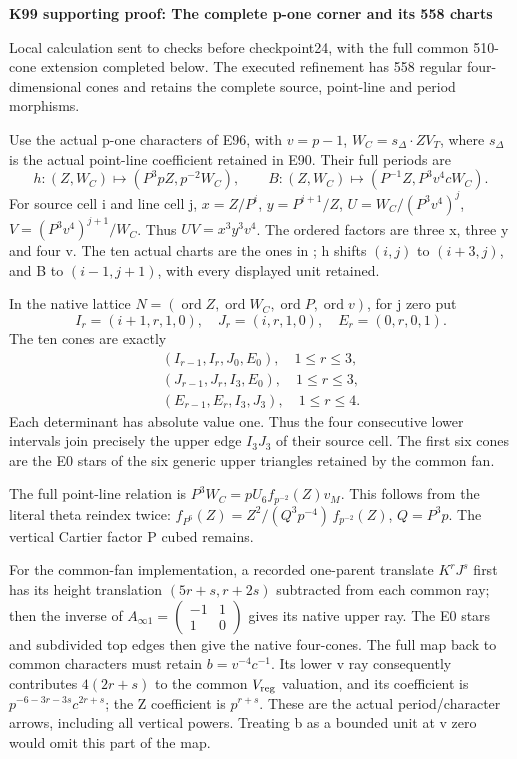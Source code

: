 \par\bigskip\noindent\textbf{K99 supporting proof: The complete p-one corner and its 558 charts}\par\nobreak
Local calculation sent to checks before checkpoint24, with the full
common 510-cone extension completed below. The executed refinement has
558 regular four-dimensional cones and retains the complete source,
point-line and period morphisms.

Use the actual p-one characters of E96, with \(v=p-1\),
\(W_C=s_\Delta\cdot ZV_T\), where \(s_\Delta\) is the actual
point-line coefficient retained in E90. Their full periods are
\[
h:(Z,W_C)\mapsto(P^3pZ,p^{-2}W_C),\qquad
B:(Z,W_C)\mapsto(P^{-1}Z,P^3v^4cW_C).
\]
For source cell i and line cell j,
\(x=Z/P^i\), \(y=P^{i+1}/Z\),
\(U=W_C/(P^3v^4)^j\), \(V=(P^3v^4)^{j+1}/W_C\).
Thus \(UV=x^3y^3v^4\). The ordered factors are three x,
three y and four v. The ten actual charts are the ones in
; h shifts \((i,j)\) to
\((i+3,j)\), and B to \((i-1,j+1)\), with every displayed
unit retained.

In the native lattice
\(N=(\operatorname{ord}Z,\operatorname{ord}W_C,
\operatorname{ord}P,\operatorname{ord}v)\), for j zero put
\[
I_r=(i+1,r,1,0),\quad J_r=(i,r,1,0),\quad E_r=(0,r,0,1).
\]
The ten cones are exactly
\[
\begin{gathered}
(I_{r-1},I_r,J_0,E_0),\quad1\le r\le3,\\
(J_{r-1},J_r,I_3,E_0),\quad1\le r\le3,\\
(E_{r-1},E_r,I_3,J_3),\quad1\le r\le4.
\end{gathered}
\]
Each determinant has absolute value one. Thus the four consecutive
lower intervals join precisely the upper edge \(I_3J_3\) of
their source cell. The first six cones are the E0 stars of the
six generic upper triangles retained by the common fan.

The full point-line relation is
\(P^3W_C=pU_6 f_{p^{-2}}(Z)v_M\). This follows from the
literal theta reindex twice:
\(f_{P^6}(Z)=Z^2/(Q^3p^{-4})\,f_{p^{-2}}(Z)\),
\(Q=P^3p\). The vertical Cartier factor P cubed remains.

For the common-fan implementation, a recorded one-parent translate
\(K^rJ^s\) first has its height translation
\((5r+s,r+2s)\) subtracted from each common ray; then the
inverse of \(A_{\infty1}=\left(\begin{smallmatrix}-1&1\\1&0
\end{smallmatrix}\right)\) gives its native upper ray. The
E0 stars and subdivided top edges then give the native four-cones.
The full map back to common characters must retain
\(b=v^{-4}c^{-1}\). Its lower v ray consequently contributes
\(4(2r+s)\) to the common \(V_{\rm reg}\) valuation, and its
coefficient is
\(p^{-6-3r-3s}c^{2r+s}\); the Z coefficient is \(p^{r+s}\).
These are the actual period/character arrows, including all
vertical powers. Treating b as a bounded unit at v zero would
omit this part of the map.

